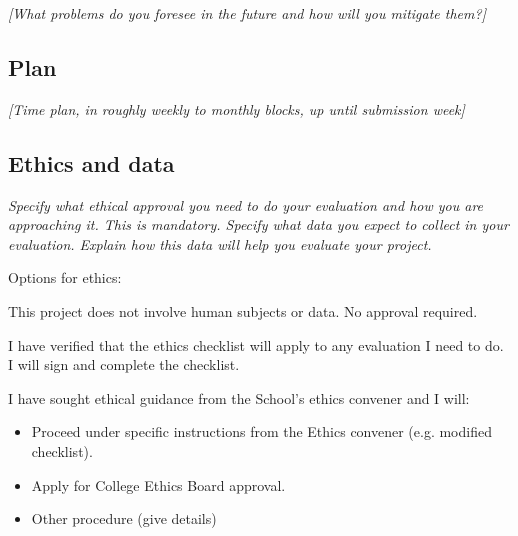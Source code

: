 \documentclass[11pt]{article}
\begin{document}
\emph{{[}What problems do you foresee in the future and how will you
mitigate them?{]}}

\subsection{Plan}\label{plan}

\emph{{[}Time plan, in roughly weekly to monthly blocks, up until
submission week{]}}

    
\subsection{Ethics and data}\label{ethics}
\emph{Specify what ethical approval you need to do your evaluation and how you are approaching it. This is mandatory. 
Specify what data you expect to collect in your evaluation. Explain how this data will help you evaluate your project.
}

Options for ethics:
\item This project does not involve human subjects or data. No approval required.
\item I have verified that the ethics checklist will apply to any evaluation I need to do. I will sign and complete the checklist.
\item I have sought ethical guidance from the School's ethics convener and I will:
\begin{itemize}
    \item Proceed under specific instructions from the Ethics convener (e.g. modified checklist).
    \item Apply for College Ethics Board approval.
    \item Other procedure (give details)
\end{itemize}    
\end{document}

